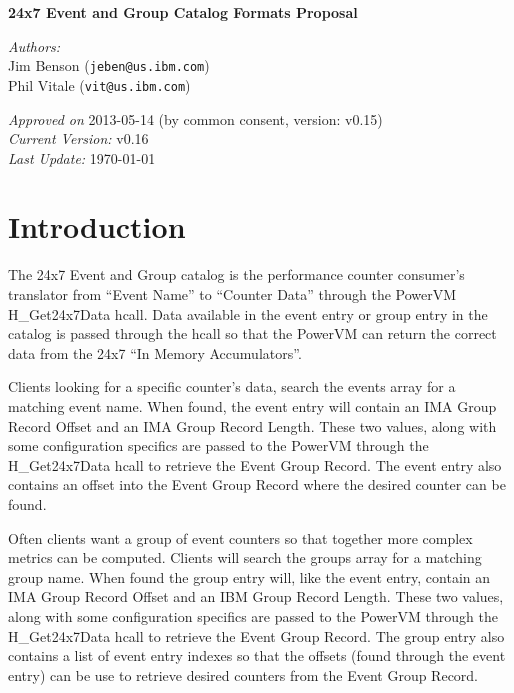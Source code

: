 \documentclass[14]{article}
\begin{document}
\begin{center}

{ \huge \bfseries 24x7 Event and Group Catalog Formats Proposal \\[0.4cm] }

\end{center}
\noindent
\emph{Authors:}\\
Jim Benson (\texttt{jeben@us.ibm.com}) \\
Phil Vitale (\texttt{vit@us.ibm.com}) \\

\begin{center}
\emph{Approved on} 2013-05-14 (by common consent, version: v0.15) \\
\emph{Current Version:} v0.16 \\
\emph{Last Update:} \today
\end{center}

\pagebreak
\tableofcontents
\pagebreak

\section{Introduction}
The 24x7 Event and Group catalog is the performance counter consumer's
translator from “Event Name” to “Counter Data” through the PowerVM
H\_Get24x7Data hcall. Data available in the event entry or group entry in the
catalog is passed through the hcall so that the PowerVM can return the correct
data from the 24x7 “In Memory Accumulators”.

Clients looking for a specific counter's data, search the events array for a
matching event name. When found, the event entry will contain an IMA Group
Record Offset and an IMA Group Record Length. These two values, along with some
configuration specifics are passed to the PowerVM through the H\_Get24x7Data
hcall to retrieve the Event Group Record. The event entry also contains an
offset into the Event Group Record where the desired counter can be found.

Often clients want a group of event counters so that together more complex
metrics can be computed. Clients will search the groups array for a matching
group name. When found the group entry will, like the event entry, contain an
IMA Group Record Offset and an IBM Group Record Length. These two values, along
with some configuration specifics are passed to the PowerVM through the
H\_Get24x7Data hcall to retrieve the Event Group Record. The group entry also
contains a list of event entry indexes so that the offsets (found through the
event entry) can be use to retrieve desired counters from the Event Group
Record.
\end{document}
